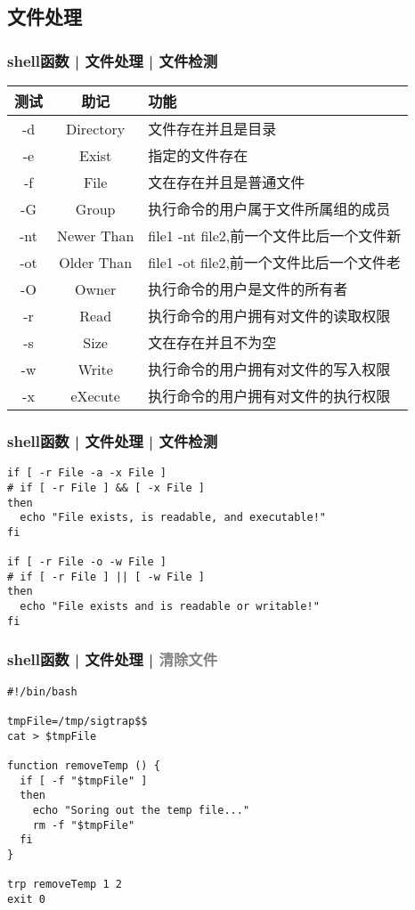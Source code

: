 \subsection{文件处理}
\begin{frame}
  \frametitle{shell函数 | 文件处理 | \alert{文件检测}}
  \begin{table}
    \centering
    \begin{tabularx}{\textwidth}{ccX}
      \hline
      \rowcolor{blue!50}测试 & 助记 & 功能\\
      \hline
      -d & Directory & 文件存在并且是目录\\
      -e & Exist & 指定的文件存在\\
      -f & File & 文在存在并且是普通文件\\
      -G & Group & 执行命令的用户属于文件所属组的成员\\
      -nt & Newer Than & file1 -nt file2,前一个文件比后一个文件新\\
      -ot & Older Than & file1 -ot file2,前一个文件比后一个文件老\\
      -O & Owner & 执行命令的用户是文件的所有者\\
      -r & Read & 执行命令的用户拥有对文件的读取权限\\
      -s & Size & 文在存在并且不为空\\
      -w & Write & 执行命令的用户拥有对文件的写入权限\\
      -x & eXecute & 执行命令的用户拥有对文件的执行权限\\
      \hline
    \end{tabularx}
  \end{table}
\end{frame}

\begin{frame}[fragile]
  \frametitle{shell函数 | 文件处理 | \alert{文件检测}}
\begin{lstlisting}
if [ -r File -a -x File ]
# if [ -r File ] && [ -x File ]
then
  echo "File exists, is readable, and executable!"
fi

if [ -r File -o -w File ]
# if [ -r File ] || [ -w File ]
then
  echo "File exists and is readable or writable!"
fi
\end{lstlisting}
\end{frame}

\begin{frame}[fragile]
  \frametitle{shell函数 | 文件处理 | \textcolor{gray}{清除文件}}
\begin{lstlisting}
#!/bin/bash

tmpFile=/tmp/sigtrap$$
cat > $tmpFile

function removeTemp () {
  if [ -f "$tmpFile" ]
  then
    echo "Soring out the temp file..."
    rm -f "$tmpFile"
  fi
}

trp removeTemp 1 2
exit 0
\end{lstlisting}
\end{frame}

